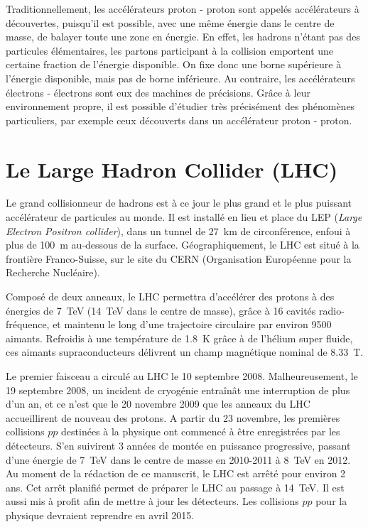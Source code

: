 Traditionnellement, les accélérateurs proton - proton sont appelés accélérateurs à découvertes, puisqu'il est possible, avec une même énergie dans le centre de masse, de balayer toute une zone en énergie. En effet, les hadrons n'étant pas des particules élémentaires, les partons participant à la collision emportent une certaine fraction de l'énergie disponible. On fixe donc une borne supérieure à l'énergie disponible, mais pas de borne inférieure. Au contraire, les accélérateurs électrons - électrons sont eux des machines de précisions. Grâce à leur environnement propre, il est possible d'étudier très précisément des phénomènes particuliers, par exemple ceux découverts dans un accélérateur proton - proton.

\section{Le Large Hadron Collider (LHC)}

Le grand collisionneur de hadrons est à ce jour le plus grand et le plus puissant accélérateur de particules au monde. Il est installé en lieu et place du LEP (\emph{Large Electron Positron collider}), dans un tunnel de \SI{27}{\km} de circonférence, enfoui à plus de \SI{100}{\m} au-dessous de la surface. Géographiquement, le LHC est situé à la frontière Franco-Suisse, sur le site du CERN (Organisation Européenne pour la Recherche Nucléaire).

Composé de deux anneaux, le LHC permettra d'accélérer des protons à des énergies de \SI{7}{\TeV} (\SI{14}{\TeV} dans le centre de masse), grâce à 16 cavités radio-fréquence, et maintenu le long d'une trajectoire circulaire par environ 9500 aimants. Refroidis à une température de \SI{1.8}{\K} grâce à de l'hélium super fluide, ces aimants supraconducteurs délivrent un champ magnétique nominal de \SI{8.33}{\tesla}.

Le premier faisceau a circulé au LHC le 10 septembre 2008. Malheureusement, le 19 septembre 2008, un incident de cryogénie entraînât une interruption de plus d'un an, et ce n'est que le 20 novembre 2009 que les anneaux du LHC accueillirent de nouveau des protons. A partir du 23 novembre, les premières collisions $pp$ destinées à la physique ont commencé à être enregistrées par les détecteurs. S'en suivirent 3 années de montée en puissance progressive, passant d'une énergie de \SI{7}{\TeV} dans le centre de masse en 2010-2011 à \SI{8}{\TeV} en 2012. Au moment de la rédaction de ce manuscrit, le LHC est arrêté pour environ 2 ans. Cet arrêt planifié permet de préparer le LHC au passage à \SI{14}{\TeV}. Il est aussi mis à profit afin de mettre à jour les détecteurs. Les collisions $pp$ pour la physique devraient reprendre en avril 2015.

